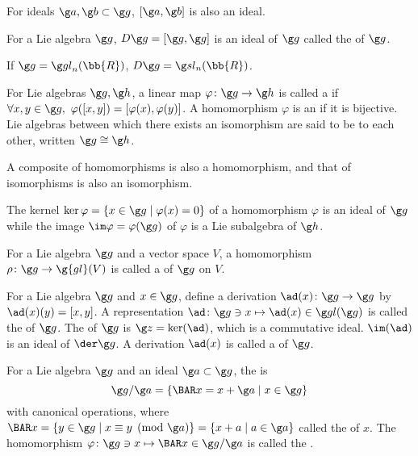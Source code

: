 For ideals $\g a, \g b \subset \g g$, $[\g a, \g b]$ is also an ideal.

For a Lie algebra $\g g$, $D\g g = [\g g, \g g]$ is an ideal of $\g g$ called the  of $\g g$.

If $\g g = \gl_n(\bb{R})$, $D\g g = \sl_n(\bb{R})$.

For Lie algebras $\g g, \g h$, a linear map $\varphi \colon \g g \to \g h$ is called a  if $\forall x, y \in \g g,\ \varphi([x,y]) = [\varphi(x), \varphi(y)]$. A homomorphism $\varphi$ is an  if it is bijective. Lie algebras between which there exists an isomorphism are said to be  to each other, written $\g g \cong \g h$.

A composite of homomorphisms is also a homomorphism, and that of isomorphisms is also an isomorphism.

The kernel $\ker \varphi = \{ x \in \g g \mid \varphi(x) = 0 \}$ of a homomorphism $\varphi$ is an ideal of $\g g$ while the image $\im \varphi = \varphi(\g g)$ of $\varphi$ is a Lie subalgebra of $\g h$.

For a Lie algebra $\g g$ and a vector space $V$, a homomorphism $\rho \colon \g g \to \g{gl}(V)$ is called a  of $\g g$ on $V$.

For a Lie algebra $\g g$ and $x \in \g g$, define a derivation $\ad (x) \colon \g g \to \g g$ by $\ad(x)(y) = [x,y]$. A representation $\ad \colon \g g \ni x \mapsto \ad(x) \in \gl (\g g)$ is called the  of $\g g$. The  of $\g g$ is $\g z = \ker(\ad)$, which is a commutative ideal. $\im(\ad)$ is an ideal of $\der \g g$. A derivation $\ad(x)$ is called a  of $\g g$.

For a Lie algebra $\g g$ and an ideal $\g a \subset \g g$, the  is
\[
\g g / \g a = \{ \BAR x = x + \g a \mid x \in \g g \}
\]
with canonical operations, where $\BAR x = \{ y \in \g g \mid x \equiv y \pmod{\g a} \} = \{ x + a \mid a \in \g a \}$ called the  of $x$. The homomorphism $\varphi \colon \g g \ni x \mapsto \BAR x \in \g g / \g a$ is called the .

